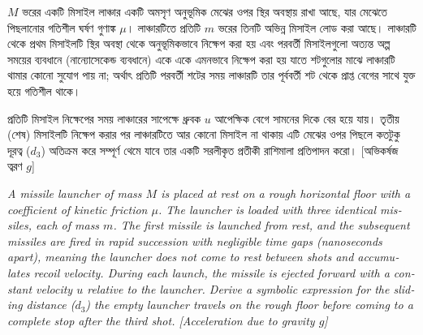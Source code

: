 \documentclass[12pt, a4paper]{article}
\begin{document}
\begin{tcolorbox}[questionbox={প্রশ্ন (Question) 11}]
\noindent
$M$ ভরের একটি মিসাইল লাঞ্চার একটি অমসৃণ অনুভূমিক মেঝের ওপর স্থির অবস্থায় রাখা আছে, যার মেঝেতে পিছলানোর গতিশীল ঘর্ষণ গুণাঙ্ক $\mu$। লাঞ্চারটিতে প্রতিটি $m$ ভরের তিনটি অভিন্ন মিসাইল লোড করা আছে। লাঞ্চারটি থেকে প্রথম মিসাইলটি স্থির অবস্থা থেকে অনুভূমিকভাবে নিক্ষেপ করা হয় এবং পরবর্তী মিসাইলগুলো অত্যন্ত অল্প সময়ের ব্যবধানে (নান্যোসেকেন্ড ব্যবধানে) একে একে এমনভাবে নিক্ষেপ করা হয় যাতে শটগুলোর মাঝে লাঞ্চারটি থামার কোনো সুযোগ পায় না; অর্থাৎ প্রতিটি পরবর্তী শটের সময় লাঞ্চারটি তার পূর্ববর্তী শট থেকে প্রাপ্ত বেগের সাথে যুক্ত হয়ে গতিশীল থাকে। 

\vspace{0.3em}
\noindent
প্রতিটি মিসাইল নিক্ষেপের সময় লাঞ্চারের সাপেক্ষে ধ্রুবক $u$ আপেক্ষিক বেগে সামনের দিকে বের হয়ে যায়। তৃতীয় (শেষ) মিসাইলটি নিক্ষেপ করার পর লাঞ্চারটিতে আর কোনো মিসাইল না থাকায় এটি মেঝের ওপর পিছলে কতটুকু দূরত্ব ($d_3$) অতিক্রম করে সম্পূর্ণ থেমে যাবে তার একটি সরলীকৃত প্রতীকী রাশিমালা প্রতিপাদন করো। [অভিকর্ষজ ত্বরণ $g$]

\vspace{0.8em}
\begin{english}
\noindent\textit{\color{darkgray}
A missile launcher of mass $M$ is placed at rest on a rough horizontal floor with a coefficient of kinetic friction $\mu$. The launcher is loaded with three identical missiles, each of mass $m$. The first missile is launched from rest, and the subsequent missiles are fired in rapid succession with negligible time gaps (nanoseconds apart), meaning the launcher does not come to rest between shots and accumulates recoil velocity. During each launch, the missile is ejected forward with a constant velocity $u$ relative to the launcher. Derive a symbolic expression for the sliding distance ($d_3$) the empty launcher travels on the rough floor before coming to a complete stop after the third shot. [Acceleration due to gravity $g$]
}
\end{english}
\end{tcolorbox}
\end{document}
